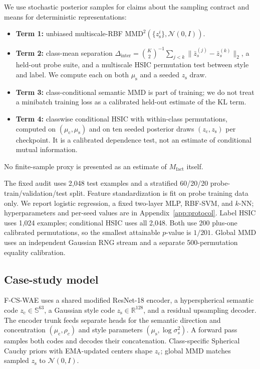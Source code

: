 \documentclass{article}
\newcommand{\ours}{F-CS-WAE}
\newcommand{\zc}{z_{\mathrm{c}}}
\newcommand{\zs}{z_{\mathrm{s}}}
\newcommand{\muc}{\mu_{\mathrm{c}}}
\newcommand{\mus}{\mu_{\mathrm{s}}}
\newcommand{\R}{\mathbb{R}}
\newcommand{\MMD}{\mathrm{MMD}}
\newcommand{\Dinter}{\Delta_{\mathrm{inter}}}
\begin{document}
We use stochastic posterior samples for claims about the sampling contract
and means for deterministic representations:
\begin{itemize}
    \item \textbf{Term 1:} unbiased multiscale-RBF
    $\MMD^2(\{\zs^i\},\mathcal N(0,I))$.
    \item \textbf{Term 2:} class-mean separation
    $\Dinter=\binom K2^{-1}\sum_{j<k}\|\bar z_s^{(j)}-\bar z_s^{(k)}\|_2$,
    a held-out probe suite, and a multiscale HSIC permutation test between
    style and label.  We compute each on both $\mus$ and a seeded $\zs$ draw.
    \item \textbf{Term 3:} class-conditional semantic MMD is part of training;
    we do not treat a minibatch training loss as a calibrated held-out
    estimate of the KL term.
    \item \textbf{Term 4:} classwise conditional HSIC with within-class
    permutations, computed on $(\muc,\mus)$ and on ten seeded posterior draws
    $(\zc,\zs)$ per checkpoint.  It is a calibrated dependence test, not an
    estimate of conditional mutual information.
\end{itemize}
No finite-sample proxy is presented as an estimate of
$M_{\mathrm{fact}}$ itself.

The fixed audit uses 2,048 test examples and a stratified 60/20/20
probe-train/validation/test split.  Feature standardization is fit on probe
training data only.  We report logistic regression, a fixed two-layer MLP,
RBF-SVM, and $k$-NN; hyperparameters and per-seed values are in
Appendix~\ref{app:protocol}.  Label HSIC uses 1,024 examples; conditional
HSIC uses all 2,048.  Both use 200 plus-one calibrated permutations, so the
smallest attainable $p$-value is $1/201$.  Global MMD uses an independent
Gaussian RNG stream and a separate 500-permutation equality calibration.

\subsection{Case-study model}

\ours{} uses a shared modified ResNet-18 encoder, a hyperspherical semantic
code $\zc\in\mathbb S^{63}$, a Gaussian style code $\zs\in\R^{128}$, and a
residual upsampling decoder.  The encoder trunk feeds separate heads for the
semantic direction and concentration $(\muc,\rho_c)$ and style parameters
$(\mus,\log\sigma_s^2)$.  A forward pass samples both codes and decodes their
concatenation.  Class-specific Spherical Cauchy priors with EMA-updated centers
shape $\zc$; global MMD matches sampled $\zs$ to $\mathcal N(0,I)$.
\end{document}
